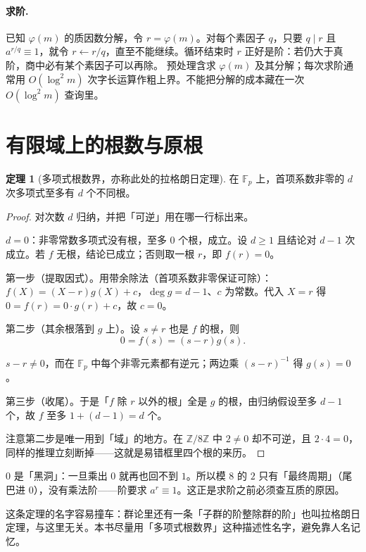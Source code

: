 \documentclass[UTF8,a4paper,11pt,twoside,openright,fontset=fandol]{ctexbook}
\theoremstyle{definition}
\newtheorem{theorem}[definition]{定理}
\newcommand{\Z}{\mathbb Z}
\begin{document}
\paragraph{求阶.} 已知 $\varphi(m)$ 的质因数分解，令 $r=\varphi(m)$。对每个素因子 $q$，只要 $q\mid r$ 且 $a^{r/q}\equiv1$，就令 $r\gets r/q$，直至不能继续。循环结束时 $r$ 正好是阶：若仍大于真阶，商中必有某个素因子可以再除。
预处理含求 $\varphi(m)$ 及其分解；每次求阶通常用 $O(\log^2m)$ 次字长运算作粗上界。不能把分解的成本藏在一次 $O(\log^2m)$ 查询里。


\section{有限域上的根数与原根}
\begin{theorem}[多项式根数界，亦称此处的拉格朗日定理]
在 $\mathbb F_p$ 上，首项系数非零的 $d$ 次多项式至多有 $d$ 个不同根。
\end{theorem}
\begin{proof}
对次数 $d$ 归纳，并把「可逆」用在哪一行标出来。

$d=0$：非零常数多项式没有根，至多 $0$ 个根，成立。设 $d\ge1$ 且结论对 $d-1$ 次成立。若 $f$ 无根，结论已成立；否则取一根 $r$，即 $f(r)=0$。

第一步（提取因式）。用带余除法（首项系数非零保证可除）：$f(X)=(X-r)g(X)+c$，$\deg g=d-1$、$c$ 为常数。代入 $X=r$ 得 $0=f(r)=0\cdot g(r)+c$，故 $c=0$。

第二步（其余根落到 $g$ 上）。设 $s\ne r$ 也是 $f$ 的根，则
\[
 0=f(s)=(s-r)g(s).
\]




$s-r\ne0$，而在 $\mathbb F_p$ 中每个非零元素都有逆元；两边乘 $(s-r)^{-1}$ 得 $g(s)=0$。

第三步（收尾）。于是「$f$ 除 $r$ 以外的根」全是 $g$ 的根，由归纳假设至多 $d-1$ 个，故 $f$ 至多 $1+(d-1)=d$ 个。

注意第二步是唯一用到「域」的地方。在 $\Z/8\Z$ 中 $2\ne0$ 却不可逆，且 $2\cdot4=0$，同样的推理立刻断掉——这就是易错框里四个根的来历。
\end{proof}

\begin{tip}[图景：$0$ 是黑洞]
$0$ 是「黑洞」：一旦乘出 $0$ 就再也回不到 $1$。所以模 $8$ 的 $2$ 只有「最终周期」（尾巴进 $0$），没有乘法阶——阶要求 $a^r\equiv1$。这正是求阶之前必须查互质的原因。
\end{tip}


\begin{tip}
这条定理的名字容易撞车：群论里还有一条「子群的阶整除群的阶」也叫拉格朗日定理，与这里无关。本书尽量用「多项式根数界」这种描述性名字，避免靠人名记忆。
\end{tip}
\end{document}
